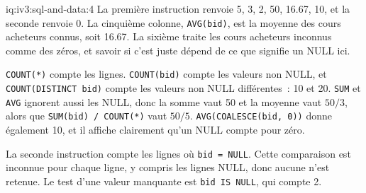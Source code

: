 \begin{solution}{iq:iv3:sql-and-data:4}
La première instruction renvoie 5, 3, 2, 50, 16.67, 10, et la seconde renvoie 0. La cinquième colonne, \texttt{AVG(bid)}, est la moyenne des cours acheteurs connus, soit 16.67. La sixième traite les cours acheteurs inconnus comme des zéros, et savoir si c'est juste dépend de ce que signifie un NULL ici.

\texttt{COUNT(*)} compte les lignes. \texttt{COUNT(bid)} compte les valeurs non NULL, et \texttt{COUNT(DISTINCT bid)} compte les valeurs non NULL différentes~: 10 et 20. \texttt{SUM} et \texttt{AVG} ignorent aussi les NULL, donc la somme vaut 50 et la moyenne vaut $50 / 3$, alors que \texttt{SUM(bid) / COUNT(*)} vaut $50 / 5$. \texttt{AVG(COALESCE(bid, 0))} donne également 10, et il affiche clairement qu'un NULL compte pour zéro.

La seconde instruction compte les lignes où \texttt{bid = NULL}. Cette comparaison est inconnue pour chaque ligne, y compris les lignes NULL, donc aucune n'est retenue. Le test d'une valeur manquante est \texttt{bid IS NULL}, qui compte 2.

\end{solution}


